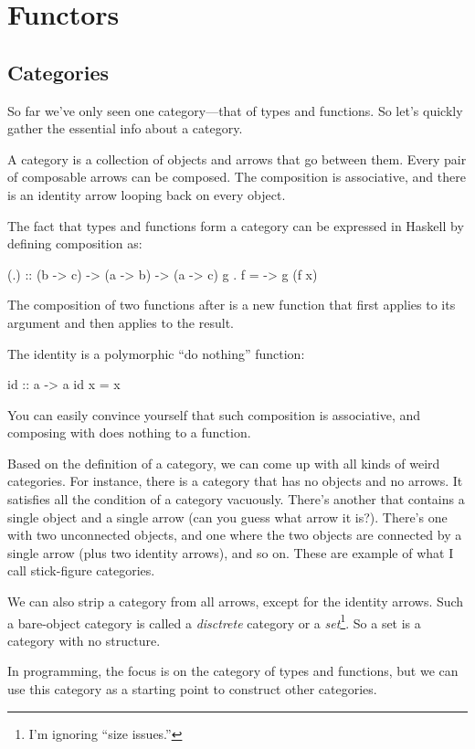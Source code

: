 \documentclass[DaoFP]{subfiles}
\begin{document}
\setcounter{chapter}{7}

\chapter{Functors}
\section{Categories}

So far we've only seen one category---that of types and functions. So let's quickly gather the essential info about a category.

A category is a collection of objects and arrows that go between them. Every pair of composable arrows can be composed. The composition is associative, and there is an identity arrow looping back on every object.

The fact that types and functions form a category can be expressed in Haskell by defining composition as:
\begin{haskell}
(.) :: (b -> c) -> (a -> b) -> (a -> c)
g . f = \x -> g (f x)
\end{haskell}
The composition of two functions  after  is a new function that first applies  to its argument and then applies  to the result.

The identity is a polymorphic ``do nothing'' function:
\begin{haskell}
id :: a -> a
id x = x
\end{haskell}
You can easily convince yourself that such composition is associative, and composing with  does nothing to a function.

Based on the definition of a category, we can come up with all kinds of weird categories. For instance, there is a category that has no objects and no arrows. It satisfies all the condition of a category vacuously. There's another that contains a single object and a single arrow (can you guess what arrow it is?). There's one with two unconnected objects, and one where the two objects are connected by a single arrow (plus two identity arrows), and so on. These are example of what I call stick-figure categories.

We can also strip a category from all arrows, except for the identity arrows. Such a bare-object category is called a \emph{disctrete} category or a \emph{set}\footnote{I'm ignoring ``size issues.''}. So a set is a category with no structure. 

 In programming, the focus is on the category of types and functions, but we can use this category as a starting point to construct other categories. 
 
\end{document}

